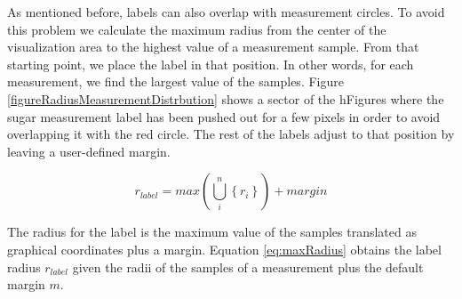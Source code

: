\documentclass[twocolumn]{bmcart}%
\begin{document}
As mentioned before, labels can also overlap with measurement circles. To avoid this problem we calculate the maximum radius from the center of the visualization area to the highest value of a measurement sample. From that starting point, we place the label in that position. In other words, for each measurement, we find the largest value of the samples. Figure \ref{figureRadiusMeasurementDistrbution} shows a sector of the hFigures where the sugar measurement label has been pushed out for a few pixels in order to avoid overlapping it with the red circle. The rest of the labels adjust to that position by leaving a user-defined margin.

\begin{equation} \label{eq:maxRadius}
	r_{label} = max(\bigcup_{i}^{n} \left \{ r_{i} \right \} ) + \textit{margin}
\end{equation}

The radius for the label is the maximum value of the samples translated as graphical coordinates plus a margin. Equation \ref{eq:maxRadius} obtains the label radius $r_{label}$ given the radii of the samples of a measurement plus the default margin $m$.




\end{document}
